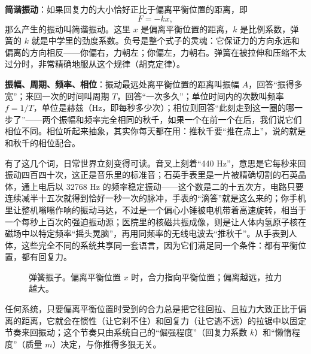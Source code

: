 \textbf{简谐振动}：如果回复力的大小恰好正比于偏离平衡位置的距离，即
\[
  F = -kx,
\]
那么产生的振动叫简谐振动。这里 \(x\) 是偏离平衡位置的距离，\(k\) 是比例系数，弹簧的 \(k\) 就是中学里的劲度系数。负号是整个式子的灵魂：它保证力的方向永远和偏离的方向相反——你偏右，力朝左；你偏左，力朝右。弹簧在被拉伸和压缩不太过分时，非常精确地服从这个规律（胡克定律）。

\textbf{振幅、周期、频率、相位}：振动最远处离平衡位置的距离叫振幅 \(A\)，回答“振得多宽”；来回一次的时间叫周期 \(T\)，回答“一次多久”；单位时间内的次数叫频率 \(f=1/T\)，单位是赫兹（Hz，即每秒多少次）；相位则回答“此刻走到这一圈的哪一步了”——两个振幅和频率完全相同的秋千，如果一个在前一个在后，我们说它们相位不同。相位听起来抽象，其实你每天都在用：推秋千要“推在点上”，说的就是和秋千的相位配合。

有了这几个词，日常世界立刻变得可读。音叉上刻着“440 Hz”，意思是它每秒来回振动四百四十次，这正是音乐里的标准音；石英手表里是一片被精确切割的石英晶体，通上电后以 32768 Hz 的频率稳定振动——这个数是二的十五次方，电路只要连续减半十五次就得到恰好一秒一次的脉冲，手表的“滴答”就是这么来的；你手机里让整机嗡嗡作响的振动马达，不过是一个偏心小锤被电机带着高速旋转，相当于一个每秒上百次的强迫振动源；医院里的核磁共振成像，则是让人体内氢原子核在磁场中以特定频率“摇头晃脑”，再用同频率的无线电波去“推秋千”。从手表到人体，这些完全不同的系统共享同一套语言，因为它们满足同一个条件：都有平衡位置，都有回复力。

\begin{figure}[htbp]
\centering
{}
\caption{弹簧振子。偏离平衡位置 \(x\) 时，合力指向平衡位置；偏离越远，拉力越大。}
\end{figure}


\begin{oneline}
任何系统，只要偏离平衡位置时受到的合力总是把它往回拉、且拉力大致正比于偏离的距离，它就会在惯性（让它刹不住）和回复力（让它逃不远）的拉锯中以固定节奏来回振动；这个节奏只由系统自己的“倔强程度”（回复力系数 \(k\)）和“懒惰程度”（质量 \(m\)）决定，与你推得多狠无关。
\end{oneline}

